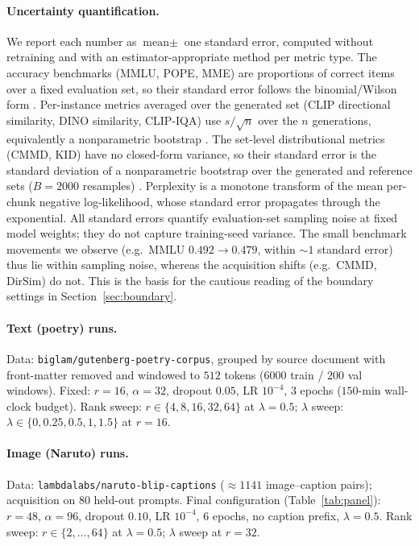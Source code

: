 \paragraph{Uncertainty quantification.}
We report each number as $\text{mean}\pm$ one standard error, computed without
retraining and with an estimator-appropriate method per metric type. The accuracy
benchmarks (MMLU, POPE, MME) are proportions of correct items over a fixed
evaluation set, so their standard error follows the binomial/Wilson form
\citep{wilson1927,brown2001interval}. Per-instance metrics averaged over the
generated set (CLIP directional similarity, DINO similarity, CLIP-IQA) use
$s/\sqrt{n}$ over the $n$ generations, equivalently a nonparametric bootstrap
\citep{efron1993bootstrap}. The set-level distributional metrics (CMMD, KID) have
no closed-form variance, so their standard error is the standard deviation of a
nonparametric bootstrap over the generated and reference sets ($B{=}2000$
resamples) \citep{efron1993bootstrap,binkowski2018demystifying}. Perplexity is a
monotone transform of the mean per-chunk negative log-likelihood, whose standard
error propagates through the exponential. All standard errors quantify
evaluation-set sampling noise at fixed model weights; they do not capture
training-seed variance. The small benchmark movements we observe (e.g.\ MMLU
$0.492\!\to\!0.479$, within $\sim\!1$ standard error) thus lie within sampling
noise, whereas the acquisition shifts (e.g.\ CMMD, DirSim) do not. This is the
basis for the cautious reading of the boundary settings in
Section~\ref{sec:boundary}.

\paragraph{Text (poetry) runs.}
Data: \texttt{biglam/gutenberg-poetry-corpus}, grouped by source document with
front-matter removed and windowed to $512$ tokens ($6000$ train / $200$ val
windows). Fixed: $r{=}16$, $\alpha{=}32$, dropout $0.05$, LR $10^{-4}$, $3$
epochs ($150$-min wall-clock budget). Rank sweep: $r\in\{4,8,16,32,64\}$ at
$\lambda{=}0.5$; $\lambda$ sweep: $\lambda\in\{0,0.25,0.5,1,1.5\}$ at $r{=}16$.

\paragraph{Image (Naruto) runs.}
Data: \texttt{lambdalabs/naruto-blip-captions} ($\approx$$1141$ image--caption
pairs); acquisition on $80$ held-out prompts. Final configuration
(Table~\ref{tab:panel}): $r{=}48$, $\alpha{=}96$, dropout $0.10$, LR $10^{-4}$,
$6$ epochs, no caption prefix, $\lambda{=}0.5$. Rank sweep:
$r\in\{2,\dots,64\}$ at $\lambda{=}0.5$; $\lambda$ sweep at $r{=}32$.

